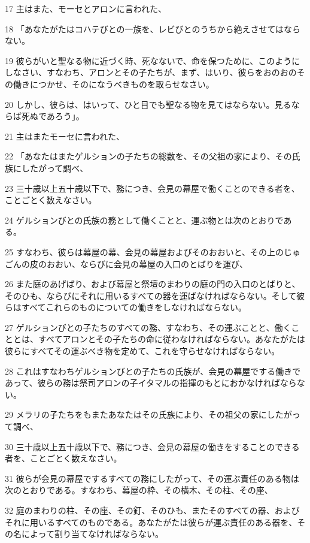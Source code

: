 \par 17 主はまた、モーセとアロンに言われた、
\par 18 「あなたがたはコハテびとの一族を、レビびとのうちから絶えさせてはならない。
\par 19 彼らがいと聖なる物に近づく時、死なないで、命を保つために、このようにしなさい、すなわち、アロンとその子たちが、まず、はいり、彼らをおのおのその働きにつかせ、そのになうべきものを取らせなさい。
\par 20 しかし、彼らは、はいって、ひと目でも聖なる物を見てはならない。見るならば死ぬであろう」。
\par 21 主はまたモーセに言われた、
\par 22 「あなたはまたゲルションの子たちの総数を、その父祖の家により、その氏族にしたがって調べ、
\par 23 三十歳以上五十歳以下で、務につき、会見の幕屋で働くことのできる者を、ことごとく数えなさい。
\par 24 ゲルションびとの氏族の務として働くことと、運ぶ物とは次のとおりである。
\par 25 すなわち、彼らは幕屋の幕、会見の幕屋およびそのおおいと、その上のじゅごんの皮のおおい、ならびに会見の幕屋の入口のとばりを運び、
\par 26 また庭のあげばり、および幕屋と祭壇のまわりの庭の門の入口のとばりと、そのひも、ならびにそれに用いるすべての器を運ばなければならない。そして彼らはすべてこれらのものについての働きをしなければならない。
\par 27 ゲルションびとの子たちのすべての務、すなわち、その運ぶことと、働くこととは、すべてアロンとその子たちの命に従わなければならない。あなたがたは彼らにすべてその運ぶべき物を定めて、これを守らせなければならない。
\par 28 これはすなわちゲルションびとの子たちの氏族が、会見の幕屋でする働きであって、彼らの務は祭司アロンの子イタマルの指揮のもとにおかなければならない。
\par 29 メラリの子たちをもまたあなたはその氏族により、その祖父の家にしたがって調べ、
\par 30 三十歳以上五十歳以下で、務につき、会見の幕屋の働きをすることのできる者を、ことごとく数えなさい。
\par 31 彼らが会見の幕屋でするすべての務にしたがって、その運ぶ責任のある物は次のとおりである。すなわち、幕屋の枠、その横木、その柱、その座、
\par 32 庭のまわりの柱、その座、その釘、そのひも、またそのすべての器、およびそれに用いるすべてのものである。あなたがたは彼らが運ぶ責任のある器を、その名によって割り当てなければならない。
